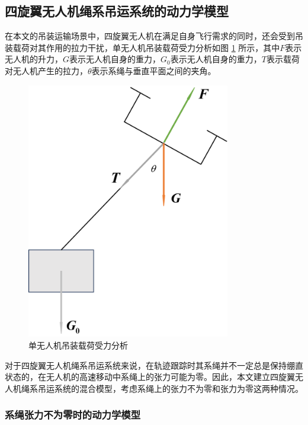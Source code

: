 \documentclass[lang=chs, degree=master, blindreview=false, winfonts=true]{yanputhesis}
\begin{document}
\subsection{四旋翼无人机绳系吊运系统的动力学模型}
在本文的吊装运输场景中，四旋翼无人机在满足自身飞行需求的同时，还会受到吊装载荷对其作用的拉力干扰，单无人机吊装载荷受力分析如图 \ref{2_2} 所示，其中$F$表示无人机的升力，$G$表示无人机自身的重力，$G_0$表示无人机自身的重力，$T$表示载荷对无人机产生的拉力，$\theta$表示系绳与垂直平面之间的夹角。
\begin{figure}[hbt!]
	\centering
	\includegraphics[width=21pc]{picture/2_2.png} 
	\caption{单无人机吊装载荷受力分析} \label{2_2}
\end{figure}

对于四旋翼无人机绳系吊运系统来说，在轨迹跟踪时其系绳并不一定总是保持绷直状态的，在无人机的高速移动中系绳上的张力可能为零。因此，本文建立四旋翼无人机绳系吊运系统的混合模型，考虑系绳上的张力不为零和张力为零这两种情况。

\subsubsection{系绳张力不为零时的动力学模型}
\end{document}
